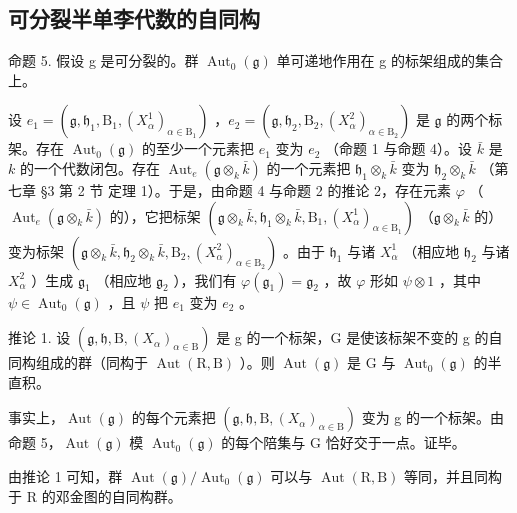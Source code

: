 \subsection{可分裂半单李代数的自同构}

命题 5. 假设 g 是可分裂的。群 \(\operatorname{Aut}_{0}(\mathfrak{g})\) 单可递地作用在 g 的标架组成的集合上。

设 \(e_1 = (\mathfrak{g}, \mathfrak{h}_1, \mathrm{B}_1, (X_\alpha^1)_{\alpha \in \mathrm{B}_1})\) ，\(e_2 = (\mathfrak{g}, \mathfrak{h}_2, \mathrm{B}_2, (X_\alpha^2)_{\alpha \in \mathrm{B}_2})\) 是 \(\mathfrak{g}\) 的两个标架。存在 \(\operatorname{Aut}_0(\mathfrak{g})\) 的至少一个元素把 \(e_1\) 变为 \(e_2\) （命题 1 与命题 4）。设 \(\bar{k}\) 是 \(k\) 的一个代数闭包。存在 \(\operatorname{Aut}_e(\mathfrak{g} \otimes_k \bar{k})\) 的一个元素把 \(\mathfrak{h}_1 \otimes_k \bar{k}\) 变为 \(\mathfrak{h}_2 \otimes_k \bar{k}\) （第七章 §3 第 2 节 定理 1）。于是，由命题 4 与命题 2 的推论 2，存在元素 \(\varphi\) （\(\operatorname{Aut}_e(\mathfrak{g} \otimes_k \bar{k})\) 的），它把标架 \((\mathfrak{g} \otimes_k \bar{k}, \mathfrak{h}_1 \otimes_k \bar{k}, \mathrm{B}_1, (X_\alpha^1)_{\alpha \in \mathrm{B}_1})\) （\(\mathfrak{g} \otimes_k \bar{k}\) 的）变为标架 \((\mathfrak{g} \otimes_k \bar{k}, \mathfrak{h}_2 \otimes_k \bar{k}, \mathrm{B}_2, (X_\alpha^2)_{\alpha \in \mathrm{B}_2})\) 。由于 \(\mathfrak{h}_1\) 与诸 \(X_\alpha^1\) （相应地 \(\mathfrak{h}_2\) 与诸 \(X_\alpha^2\) ）生成 \(\mathfrak{g}_1\) （相应地 \(\mathfrak{g}_2\) ），我们有 \(\varphi(\mathfrak{g}_1) = \mathfrak{g}_2\) ，故 \(\varphi\) 形如 \(\psi \otimes 1\) ，其中 \(\psi \in \operatorname{Aut}_0(\mathfrak{g})\) ，且 \(\psi\) 把 \(e_1\) 变为 \(e_2\) 。

推论 1. 设 \((\mathfrak{g},\mathfrak{h},\mathrm{B},(X_{\alpha})_{\alpha\in\mathrm{B}})\) 是 g 的一个标架，G 是使该标架不变的 g 的自同构组成的群（同构于 \(\operatorname{Aut}(\mathrm{R},\mathrm{B})\) ）。则 \(\operatorname{Aut}(\mathfrak{g})\) 是 G 与 \(\operatorname{Aut}_{0}(\mathfrak{g})\) 的半直积。

事实上，\(\operatorname{Aut}(\mathfrak{g})\) 的每个元素把 \((\mathfrak{g},\mathfrak{h},\mathrm{B},(X_{\alpha})_{\alpha\in\mathrm{B}})\) 变为 g 的一个标架。由命题 5，\(\operatorname{Aut}(\mathfrak{g})\) 模 \(\operatorname{Aut}_{0}(\mathfrak{g})\) 的每个陪集与 G 恰好交于一点。证毕。

由推论 1 可知，群 \(\operatorname{Aut}(\mathfrak{g})/\operatorname{Aut}_{0}(\mathfrak{g})\) 可以与 \(\operatorname{Aut}(\mathrm{R},\mathrm{B})\) 等同，并且同构于 R 的邓金图的自同构群。

